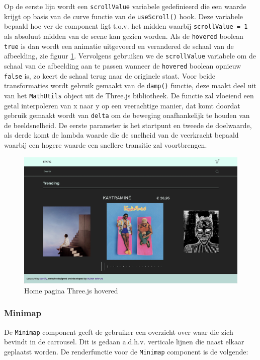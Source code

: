 Op de eerste lijn wordt een \texttt{scrollValue} variabele gedefinieerd die een waarde krijgt op basis van de curve functie van de \texttt{useScroll()} hook. Deze variabele bepaald hoe ver de component ligt t.o.v. het midden waarbij \texttt{scrollValue = 1} als absoluut midden van de scene kan gezien worden. Als de \texttt{hovered} boolean \texttt{true} is dan wordt een animatie uitgevoerd en verandered de schaal van de afbeelding, zie figuur \ref{fig:desktopHomeThreeHovered}. Vervolgens gebruiken we de \texttt{scrollValue} variabele om de schaal van de afbeelding aan te passen wanneer de \texttt{hovered} boolean opnieuw \texttt{false} is, zo keert de schaal terug naar de originele staat. 
Voor beide transformaties wordt gebruik gemaakt van de \texttt{damp()} functie, deze maakt deel uit van het \texttt{MathUtils} object uit de Three.js bibliotheek. De functie zal vloeiend een getal interpoleren van x naar y op een veerachtige manier, dat komt doordat gebruik gemaakt wordt van \texttt{delta} om de beweging onafhankelijk te houden van de beeldsnelheid. De eerste parameter is het startpunt en tweede de doelwaarde, als derde komt de lambda waarde die de snelheid van de veerkracht bepaald waarbij een hogere waarde een snellere transitie zal voortbrengen.

\begin{figure}[h]
	\centering
	\includegraphics[width=1\linewidth]{graphics/desktopHomeThreeHovered}
	\caption[Home pagina Three.js hovered]{Home pagina Three.js hovered}
	\label{fig:desktopHomeThreeHovered}
\end{figure}
\newpage
\subsubsection{Minimap}

De \texttt{Minimap} component geeft de gebruiker een overzicht over waar die zich bevindt in de carrousel. Dit is gedaan a.d.h.v. verticale lijnen die naast elkaar geplaatst worden. De renderfunctie voor de \texttt{Minimap} component is de volgende: 

